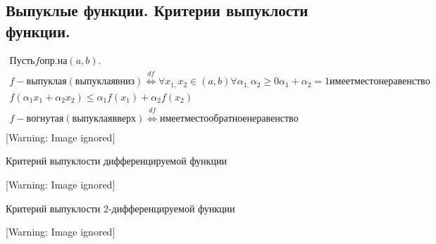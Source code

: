 \documentclass[a4paper]{article}
\begin{document}
\subsection{Выпуклые функции. Критерии выпуклости функции. }

$\begin{gathered}\mathit{\text{П}\text{у}\text{с}\text{т}\text{ь}}f\mathit{\text{о}\text{п}\text{р}.}\mathit{\text{н}\text{а}}(a,b).\\f-\mathit{\text{в}\text{ы}\text{п}\text{у}\text{к}\text{л}\text{а}\text{я}}(\mathit{\text{в}\text{ы}\text{п}\text{у}\text{к}\text{л}\text{а}\text{я}}\mathit{\text{в}\text{н}\text{и}\text{з}})\overset{\mathit{df}}{\Leftrightarrow
}\forall x_{1,}x_2\in (a,b)\forall \alpha _{1,}\alpha _2\ge 0\alpha _1+\alpha
_2=1\mathit{\text{и}\text{м}\text{е}\text{е}\text{т}}\mathit{\text{м}\text{е}\text{с}\text{т}\text{о}}\mathit{\text{н}\text{е}\text{р}\text{а}\text{в}\text{е}\text{н}\text{с}\text{т}\text{в}\text{о}}\\f(\alpha
_1x_1+\alpha _2x_2)\le \alpha _1f(x_1)+\alpha
_2f(x_2)\\f-\mathit{\text{в}\text{о}\text{г}\text{н}\text{у}\text{т}\text{а}\text{я}}(\mathit{\text{в}\text{ы}\text{п}\text{у}\text{к}\text{л}\text{а}\text{я}}\mathit{\text{в}\text{в}\text{е}\text{р}\text{х}})\overset{\mathit{df}}{\Leftrightarrow
}\mathit{\text{и}\text{м}\text{е}\text{е}\text{т}}\mathit{\text{м}\text{е}\text{с}\text{т}\text{о}}\mathit{\text{о}\text{б}\text{р}\text{а}\text{т}\text{н}\text{о}\text{е}}\mathit{\text{н}\text{е}\text{р}\text{а}\text{в}\text{е}\text{н}\text{с}\text{т}\text{в}\text{о}}\\{}\end{gathered}$
 [Warning: Image ignored] %
 

Критерий выпуклости дифференцируемой функции

  [Warning: Image ignored] %
 

Критерий выпуклости 2-дифференцируемой функции

  [Warning: Image ignored] %
 
\end{document}
